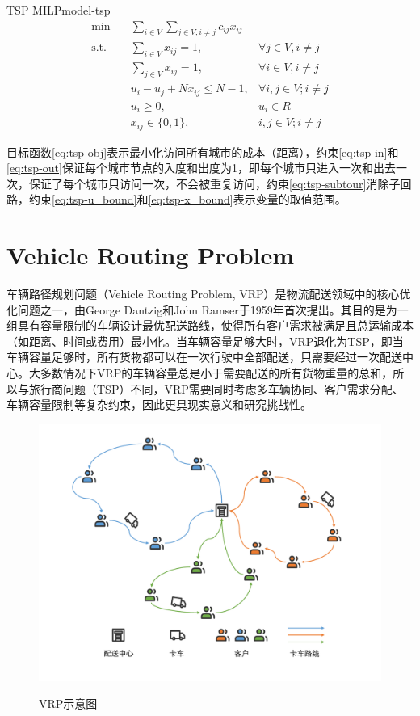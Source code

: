\begin{model}{TSP MILP}{model-tsp}
\begin{align}
    \min \quad & \sum_{i \in V}\sum_{j \in V, i \neq j} c_{ij}x_{ij} & \label{eq:tsp-obj}\\
    \text{s.t.} \quad & \sum_{i \in V} x_{ij} = 1, & \forall j \in V, i \neq j\label{eq:tsp-in}\\
    \quad & \sum_{j \in V} x_{ij} = 1, & \forall i \in V, i \neq j \label{eq:tsp-out}\\
    \quad & u_i - u_j + Nx_{ij} \leq N - 1, & \forall i, j \in V; i \neq j \label{eq:tsp-subtour}\\
    \quad & u_i \geq 0, & u_i \in R \label{eq:tsp-u_bound}\\
    \quad & x_{ij} \in \{0, 1\}, & i, j \in V; i \neq j\label{eq:tsp-x_bound}
\end{align}
\end{model}

目标函数\ref{eq:tsp-obj}表示最小化访问所有城市的成本（距离），约束\ref{eq:tsp-in}和\ref{eq:tsp-out}保证每个城市节点的入度和出度为1，即每个城市只进入一次和出去一次，保证了每个城市只访问一次，不会被重复访问，约束\ref{eq:tsp-subtour}消除子回路，约束\ref{eq:tsp-u_bound}和\ref{eq:tsp-x_bound}表示变量的取值范围。

\section{Vehicle Routing Problem}
车辆路径规划问题（Vehicle Routing Problem, VRP）是物流配送领域中的核心优化问题之一，由George Dantzig和John Ramser于1959年首次提出\cite{1959The}。其目的是为一组具有容量限制的车辆设计最优配送路线，使得所有客户需求被满足且总运输成本（如距离、时间或费用）最小化。当车辆容量足够大时，VRP退化为TSP，即当车辆容量足够时，所有货物都可以在一次行驶中全部配送，只需要经过一次配送中心。大多数情况下VRP的车辆容量总是小于需要配送的所有货物重量的总和，所以与旅行商问题（TSP）不同，VRP需要同时考虑多车辆协同、客户需求分配、车辆容量限制等复杂约束，因此更具现实意义和研究挑战性。

\begin{figure}[!htb]
    \centering
    \includegraphics[width=\linewidth]{images/VRP.pdf}\\
    \caption{VRP示意图}
\end{figure}


